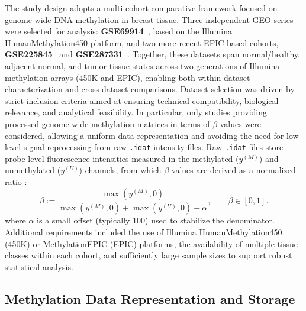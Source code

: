 The study design adopts a multi-cohort comparative framework focused on genome-wide DNA methylation in breast tissue. Three independent GEO series were selected for analysis: \textbf{GSE69914}~\cite{GSE69914}, based on the Illumina HumanMethylation450 platform, and two more recent EPIC-based cohorts, \textbf{GSE225845}~\cite{GSE225845} and \textbf{GSE287331}~\cite{GSE287331}. Together, these datasets span normal/healthy, adjacent-normal, and tumor tissue states across two generations of Illumina methylation arrays (450K and EPIC), enabling both within-dataset characterization and cross-dataset comparisons.
Dataset selection was driven by strict inclusion criteria aimed at ensuring technical compatibility, biological relevance, and analytical feasibility. In particular, only studies providing processed genome-wide methylation matrices in terms of $\beta$-values were considered, allowing a uniform data representation and avoiding the need for low-level signal reprocessing from raw \texttt{.idat}  intensity files. Raw \texttt{.idat} files store probe-level fluorescence intensities measured in the methylated ($y^{(M)}$) and unmethylated ($y^{(U)}$) channels, from which $\beta$-values are derived as a normalized ratio \cite{Du2010}:
\begin{equation}
\beta := \frac{\max(y^{(M)},0)}{\max(y^{(M)},0)+\max(y^{(U)},0)+\alpha},
\qquad \beta\in[0,1].
\label{eq:beta_definition}
\end{equation}
where $\alpha$ is a small offset (typically 100) used to stabilize the denominator. Additional requirements included the use of Illumina HumanMethylation450 (450K) or MethylationEPIC (EPIC) platforms, the availability of multiple tissue classes within each cohort, and sufficiently large sample sizes to support robust statistical analysis.

\subsection{Methylation Data Representation and Storage}

